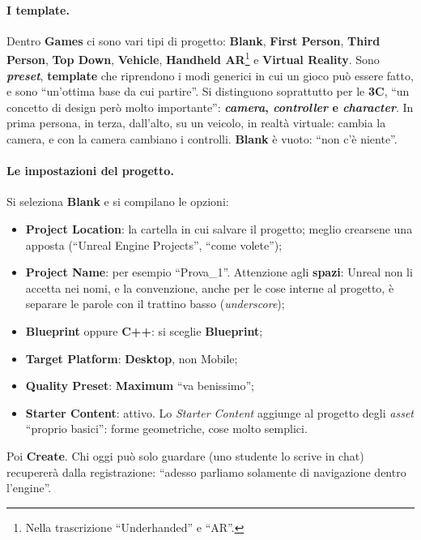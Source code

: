 \paragraph{I template.} Dentro \textbf{Games} ci sono vari tipi di progetto:
\textbf{Blank}, \textbf{First Person}, \textbf{Third Person}, \textbf{Top Down},
\textbf{Vehicle}, \textbf{Handheld AR}\footnote{Nella trascrizione ``Underhanded'' e
``AR''.} e \textbf{Virtual Reality}. Sono \textbf{\emph{preset}}, \textbf{template} che
riprendono i modi generici in cui un gioco può essere fatto, e sono ``un'ottima base da
cui partire''. Si distinguono soprattutto per le \textbf{3C}, ``un concetto di design
però molto importante'': \textbf{\emph{camera}, \emph{controller} e
\emph{character}}. In prima persona, in terza, dall'alto, su un veicolo, in realtà
virtuale: cambia la camera, e con la camera cambiano i controlli. \textbf{Blank} è
vuoto: ``non c'è niente''.

\paragraph{Le impostazioni del progetto.} Si seleziona \textbf{Blank} e si compilano le
opzioni:
\begin{itemize}
  \item \textbf{Project Location}: la cartella in cui salvare il progetto; meglio
        crearsene una apposta (``Unreal Engine Projects'', ``come volete'');
  \item \textbf{Project Name}: per esempio ``Prova\_1''. Attenzione agli
        \textbf{spazi}: Unreal non li accetta nei nomi, e la convenzione, anche per le
        cose interne al progetto, è separare le parole con il trattino basso
        (\emph{underscore});
  \item \textbf{Blueprint} oppure \textbf{C++}: si sceglie \textbf{Blueprint};
  \item \textbf{Target Platform}: \textbf{Desktop}, non Mobile;
  \item \textbf{Quality Preset}: \textbf{Maximum} ``va benissimo'';
  \item \textbf{Starter Content}: attivo. Lo \emph{Starter Content} aggiunge al progetto
        degli \emph{asset} ``proprio basici'': forme geometriche, cose molto semplici.
\end{itemize}
Poi \textbf{Create}. Chi oggi può solo guardare (uno studente lo scrive in chat)
recupererà dalla registrazione: ``adesso parliamo solamente di navigazione dentro
l'engine''.

